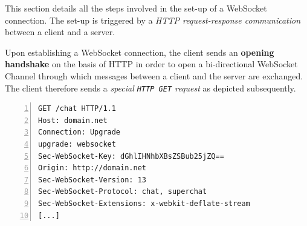 \documentclass[a4paper, justified, notoc]{tufte-handout} %
\begin{document}
This section details all the steps involved in the set-up of a WebSocket connection. The set-up is triggered by a \emph{HTTP request-response communication} between a client and a server.

Upon establishing a WebSocket connection, the client sends an \textbf{opening handshake} on the basis of HTTP in order to open a bi-directional WebSocket Channel through which messages between a client and the server are exchanged. The client therefore sends a \emph{special \texttt{HTTP GET} request} as depicted subsequently.

\newpage
\begin{Verbatim}[gobble=0,frame=lines,numbers=left]
GET /chat HTTP/1.1
Host: domain.net
Connection: Upgrade
upgrade: websocket
Sec-WebSocket-Key: dGhlIHNhbXBsZSBub25jZQ== 
Origin: http://domain.net
Sec-WebSocket-Version: 13
Sec-WebSocket-Protocol: chat, superchat 
Sec-WebSocket-Extensions: x-webkit-deflate-stream 
[...]
\end{Verbatim}

\end{document}
